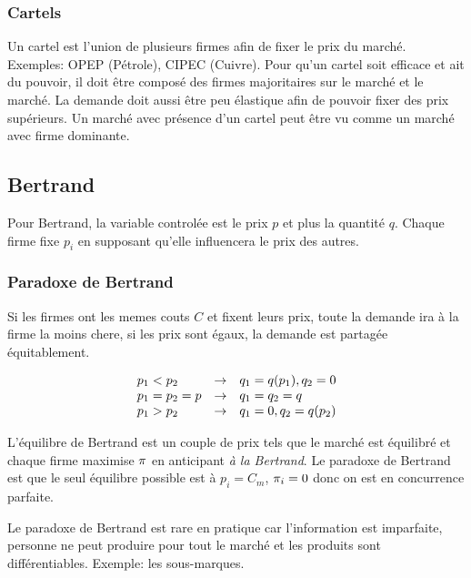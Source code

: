 

\subsubsection{Cartels}
Un cartel est l'union de plusieurs firmes afin de fixer le prix du marché.
Exemples: OPEP (Pétrole), CIPEC (Cuivre).
Pour qu'un cartel soit efficace et ait du pouvoir, il doit être composé
des firmes majoritaires sur le marché et le marché. La demande doit aussi
être peu élastique afin de pouvoir fixer des prix supérieurs.
Un marché avec présence d'un cartel peut être vu comme un marché avec firme dominante.


\subsection{Bertrand}
Pour Bertrand, la variable controlée est le prix $p$ et plus la quantité $q$.
Chaque firme fixe $p_i$ en supposant qu'elle influencera le prix des autres.

\subsubsection{Paradoxe de Bertrand}
Si les firmes ont les memes couts $C$ et fixent leurs prix,
toute la demande ira à la firme la moins chere, 
si les prix sont égaux, la demande est partagée équitablement.

\begin{equation}
	\begin{array}{l c l}
	p_1 < p_2 &\rightarrow& q_1 = q(p_1), q_2 = 0 \\
	p_1 = p_2 = p &\rightarrow& q_1 = q_2 = q \\
	p_1 > p_2 &\rightarrow& q_1 = 0, q_2 = q(p_2)
	\end{array}
\end{equation}

L'équilibre de Bertrand est un couple de prix tels que le marché est équilibré
et chaque firme maximise $\pi$ en anticipant \emph{à la Bertrand}.
Le paradoxe de Bertrand est que le seul équilibre possible est à
$p_i = C_{m}$, $\pi_i = 0$ donc on est en concurrence parfaite.

Le paradoxe de Bertrand est rare en pratique car l'information est imparfaite,
personne ne peut produire pour tout le marché et les produits sont différentiables.
Exemple: les sous-marques.


